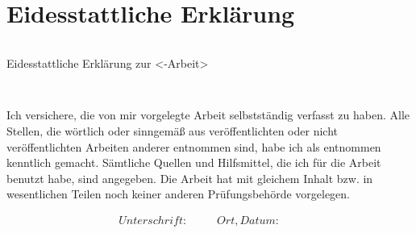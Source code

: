 \section*{Eidesstattliche Erklärung}
\thispagestyle{empty}

\begin{verbatim}

\end{verbatim}

\begin{LARGE}Eidesstattliche Erklärung zur <-Arbeit>\end{LARGE}
\begin{verbatim}


\end{verbatim}
Ich versichere, die von mir vorgelegte Arbeit selbstständig verfasst zu haben. Alle Stellen, die wörtlich oder sinngemäß aus veröffentlichten oder nicht veröffentlichten Arbeiten anderer entnommen sind, habe ich als entnommen kenntlich gemacht. Sämtliche Quellen und Hilfsmittel, die ich für die Arbeit benutzt habe, sind angegeben. Die Arbeit hat mit gleichem Inhalt bzw. in wesentlichen Teilen noch keiner anderen Prüfungsbehörde vorgelegen.



\begin{displaymath}
\begin{array}{ll}
Unterschrift:~~~~~~~~
& Ort, Datum:~~~~~~~~
\end{array}
\end{displaymath}
